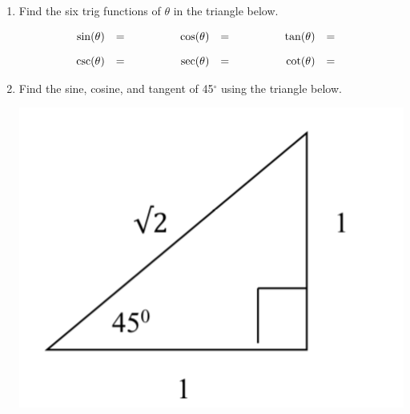 \begin{enumerate}
\item Find the six trig functions of $\theta$ in the triangle below.
  \begin{center}
\end{center}
\begin{eqnarray*}
  \begin{array}{rcl@{\hspace{4em}}rcl@{\hspace{4em}}rcl}
    \sin(\theta) & = &  & 
    \cos(\theta) & = &  &
    \tan(\theta) & = &  \\ [10pt]
    \csc(\theta) & = &  & 
    \sec(\theta) & = &  &
    \cot(\theta) & = & 
  \end{array}
\end{eqnarray*}

\item Find the sine, cosine, and tangent of 45$^{\circ}$ using the triangle below.

  \includegraphics[scale=.6]{trigex2}\\


\end{enumerate}
